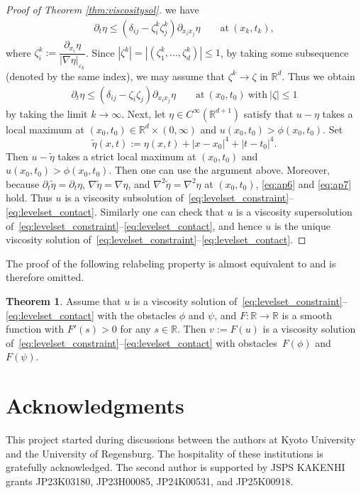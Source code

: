 \documentclass{amsart}
\theoremstyle{definition}
\newtheorem{theorem}[definition]{Theorem}
\def\R{{\mathbb{R}}}
\begin{document}
\begin{proof}[Proof of Theorem \ref{thm:viscositysol}]
we have
\begin{equation*}
\begin{split}
    \partial _t \eta 
\leq  
\left( \delta_{ij} - \zeta _i ^k \zeta _j ^k \right) \partial_{x_i x_j} \eta
\qquad \text{at} \ (x_k,t_k),
\end{split}
\end{equation*}
where 
$\zeta_i ^k :=\dfrac{\partial_{x_i} \eta }{|\nabla \eta |_{\varepsilon _k} }$. Since 
$|\zeta ^k| =|(\zeta _1 ^k,\dots,\zeta_d ^k)|\leq 1$,
by taking some subsequence (denoted by the same index), we may assume that $\zeta^k \to \zeta$ in $\R^d$. Thus we obtain 
\begin{equation}\label{eq:ap7}
\begin{split}
    \partial _t \eta 
\leq  
\left( \delta_{ij} - \zeta _i \zeta _j  \right) \partial_{x_i x_j} \eta
\qquad \text{at} \ (x_0,t_0)
\ \text{with} \ |\zeta|\leq 1
\end{split}
\end{equation}
by taking the limit $k\to \infty$.
Next, let $\eta \in C^\infty (\R^{d+1})$ satisfy that $u-\eta$ takes a local maximum at $(x_0, t_0) \in \R^d \times (0,\infty)$
and $u(x_0,t_0)>\phi (x_0,t_0)$. Set
\[
\tilde \eta (x,t):=
\eta (x,t)+ |x-x_0|^4 + |t-t_0|^4 .
\]
Then $u-\tilde \eta$ takes a strict local maximum at $(x_0,t_0)$ and $u(x_0,t_0) > \phi (x_0,t_0)$. Then one can use the argument above. Moreover, because $\partial _t \tilde \eta =\partial _t \eta$, $\nabla \tilde \eta =\nabla \eta$, and $\nabla ^2 \tilde \eta= \nabla ^2 \eta $ at $(x_0,t_0)$,
\eqref{eq:ap6} and \eqref{eq:ap7} hold.
Thus $u$ is a viscosity subsolution of~\eqref{eq:levelset_constraint}--\eqref{eq:levelset_contact}.
Similarly one can check that $u$ is a viscosity supersolution of~\eqref{eq:levelset_constraint}--\eqref{eq:levelset_contact}, and hence $u$ is the unique viscosity solution of~\eqref{eq:levelset_constraint}--\eqref{eq:levelset_contact}.
\end{proof}

The proof of the following relabeling property is almost equivalent to \cite[Theorem 2.8]{MR1100206} and is therefore omitted.
\begin{theorem}
Assume that $u$ is a viscosity solution of~\eqref{eq:levelset_constraint}--\eqref{eq:levelset_contact} with the obstacles $\phi$ and $\psi$, and $F:\R \to \R$ is a smooth function with $F'(s)>0$ for any $s \in \R$. Then $v:= F (u)$ is a viscosity solution of~\eqref{eq:levelset_constraint}--\eqref{eq:levelset_contact} with obstacles~$F(\phi)$ and $F(\psi)$.
\end{theorem}

\section*{Acknowledgments}
    This project started during discussions between the authors at Kyoto University and the University of Regensburg. The hospitality of these institutions is gratefully acknowledged.
    The second author is supported
    by JSPS KAKENHI grants
    JP23K03180, JP23H00085, 
    JP24K00531, and JP25K00918.




\end{document}
